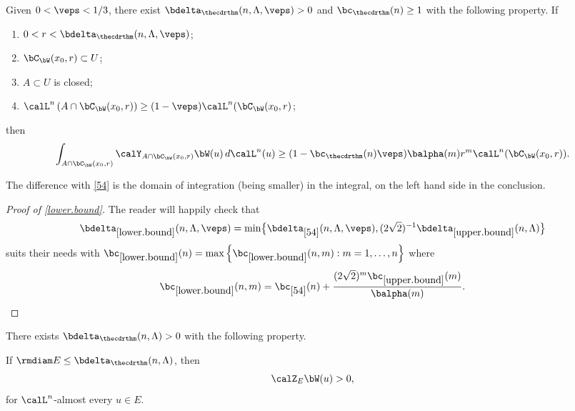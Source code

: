 \begin{Proposition}
\label{lower.bound}
Given $0 < \veps < 1/3$, there exist $\bdelta_{\thecdrthm}(n,\Lambda,\veps)>0$ and $\bc_{\thecdrthm}(n) \geq 1$ with the following property. If
\begin{enumerate}
\item $0 < r < \bdelta_{\thecdrthm}(n,\Lambda,\veps)$;
\item $\bC_\bW(x_0,r) \subset U$;
\item $A \subset U$ is closed;
\item $\calL^n \left(A \cap \bC_\bW(x_0,r) \right) \geq (1 - \veps) \calL^n (\bC_\bW(x_0,r)$;
\end{enumerate}
then
\begin{equation*}
\int_{A \cap \bC_\bW(x_0,r)} \calY_{A \cap \bC_\bW(x_0,r)} \bW (u) \,d\calL^n(u) \geq (1 - \bc_{\thecdrthm}(n) \veps) \balpha(m)r^m\calL^n(\bC_\bW(x_0,r)).
\end{equation*}
\end{Proposition}

\begin{Remark}
The difference with \ref{54} is the domain of integration (being smaller) in the integral, on the left hand side in the conclusion.
\end{Remark}

\begin{proof}[Proof of \ref{lower.bound}]
The reader will happily check that
\begin{equation*}
\bdelta_{\ref{lower.bound}}(n,\Lambda,\veps) = \min \bigl\{\bdelta_{\ref{54}}(n,\Lambda,\veps),(2\sqrt{2})^{-1} \bdelta_{\ref{upper.bound}}(n,\Lambda)\bigr\}
\end{equation*}
suits their needs with $\bc_{\ref{lower.bound}}(n) = \max \left\{ \bc_{\ref{lower.bound}}(n,m): m=1,\ldots,n \right\}$ where
\begin{equation*}
\bc_{\ref{lower.bound}}(n,m) = \bc_{\ref{54}}(n) + \frac{(2 \sqrt{2})^m\bc_{\ref{upper.bound}}(m)}{\balpha(m)}.\qedhere
\end{equation*}
\end{proof}

\begin{proposition}
\label{Z.positive}
There exists $\bdelta_{\thecdrthm}(n,\Lambda) > 0$ with the following property.

If $\rmdiam E \leq \bdelta_{\thecdrthm}(n,\Lambda)$, then
\begin{equation*}
\calZ_E \bW(u) > 0,
\end{equation*}
for $\calL^n$-almost every $u \in E$.
\end{proposition}


